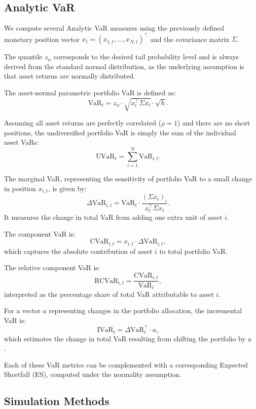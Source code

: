 \documentclass{article}
\begin{document}
\subsection{Analytic VaR}

We compute several Analytic VaR measures using the previously defined monetary position vector \( x_t = (x_{1,t}, \dots, x_{N,t})^\top \) and the covariance matrix \( \Sigma \). 

The quantile \( z_\alpha \) corresponds to the desired tail probability level and is always derived from the standard normal distribution, as the underlying assumption is that asset returns are normally distributed.

The asset-normal parametric portfolio VaR is defined as:
\[
  \text{VaR}_t = z_\alpha \cdot \sqrt{x_t^\top \Sigma x_t} \cdot \sqrt{h}.
\]

Assuming all asset returns are perfectly correlated (\( \rho = 1 \)) and there are no short positions, the undiversified portfolio VaR is simply the sum of the individual asset VaRs:
\[
  \text{UVaR}_t = \sum_{i=1}^N \text{VaR}_{i,t}.
\]

The marginal VaR, representing the sensitivity of portfolio VaR to a small change in position \( x_{i,t} \), is given by:
\[
  \Delta \text{VaR}_{i,t} = \text{VaR}_t \cdot \frac{(\Sigma x_t)_i}{x_t^\top \Sigma x_t}.
\]
It measures the change in total VaR from adding one extra unit of asset \( i \).

The component VaR is:
\[
  \text{CVaR}_{i,t} = x_{i,t} \cdot \Delta \text{VaR}_{i,t},
\]
which captures the absolute contribution of asset \( i \) to total portfolio VaR.

The relative component VaR is:
\[
  \text{RCVaR}_{i,t} = \frac{\text{CVaR}_{i,t}}{\text{VaR}_t},
\]
interpreted as the percentage share of total VaR attributable to asset \( i \).

For a vector \( a \) representing changes in the portfolio allocation, the incremental VaR is:
\[
  \text{IVaR}_t = \Delta \text{VaR}_t^\top \cdot a,
\]
which estimates the change in total VaR resulting from shifting the portfolio by \( a \).

Each of these VaR metrics can be complemented with a corresponding Expected Shortfall (ES), computed under the normality assumption.


\subsection{Simulation Methods}
\end{document}
